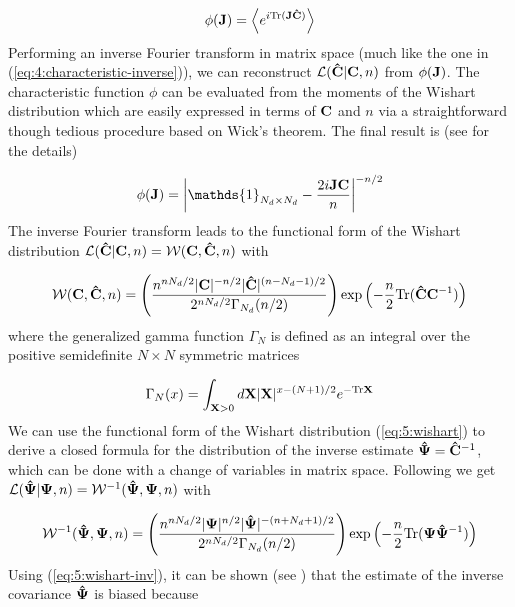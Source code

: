 \begin{equation}
\label{eq:5:chardef}
\phi(\mathbf{J}) = \left\langle e^{i{\rm Tr}(\mathbf{J}\mathbf{\hat{C}})}\right\rangle
\end{equation}
%
Performing an inverse Fourier transform in matrix space (much like the one in (\ref{eq:4:characteristic-inverse})), we can reconstruct $\mathcal{L}(\mathbf{\hat{C}}\vert\mathbf{C},n)$ from $\phi(\mathbf{J})$. The characteristic function $\phi$ can be evaluated from the moments of the Wishart distribution which are easily expressed in terms of $\mathbf{C}$ and $n$ via a straightforward though tedious procedure based on Wick's theorem. The final result is (see \citep{Taylor12} for the details)

\begin{equation}
\label{eq:5:charw}
\phi(\bb{J}) = \left\vert\mathds{1}_{N_d\times N_d}-\frac{2i\bb{JC}}{n}\right\vert^{-n/2}
\end{equation}
%
The inverse Fourier transform leads to the functional form of the Wishart distribution $\mathcal{L}(\mathbf{\hat{C}}\vert\mathbf{C},n) = \mathcal{W}(\mathbf{C},\mathbf{\hat{C}},n)$ with

\begin{equation}
\label{eq:5:wishart}
\mathcal{W}(\mathbf{C},\mathbf{\hat{C}},n) =  \left(\frac{n^{nN_d/2}\vert \mathbf{C}\vert^{-n/2}\vert\mathbf{\hat{C}}\vert^{(n-N_d-1)/2}}{2^{nN_d/2}\Gamma_{N_d}(n/2)}\right)\exp\left(-\frac{n}{2}{\rm Tr}(\mathbf{\hat{C}}\mathbf{C}^{-1})\right)
\end{equation}
%
where the generalized gamma function $\Gamma_N$ is defined as an integral over the positive semidefinite $N\times N$ symmetric matrices 

\begin{equation}
\label{eq:5:gengamma}
\Gamma_N(x) = \int_{\mathbf{X}>0}d\mathbf{X}\vert\mathbf{X}\vert^{x-(N+1)/2}e^{-{\rm Tr}\mathbf{X}}
\end{equation}
%
We can use the functional form of the Wishart distribution (\ref{eq:5:wishart}) to derive a closed formula for the distribution of the inverse estimate $\mathbf{\hat{\Psi}}=\mathbf{\hat{C}}^{-1}$, which can be done with a change of variables in matrix space. Following \citep{Taylor12} we get $\mathcal{L}(\mathbf{\hat{\Psi}}\vert\mathbf{\Psi},n) = \mathcal{W}^{-1}(\mathbf{\hat{\Psi}},\mathbf{\Psi},n)$ with 

\begin{equation}
\label{eq:5:wishart-inv}
\mathcal{W}^{-1}(\mathbf{\hat{\Psi}},\mathbf{\Psi},n) = \left(\frac{n^{nN_d/2}\vert \mathbf{\Psi}\vert^{n/2}\vert\mathbf{\hat{\Psi}}\vert^{-(n+N_d+1)/2}}{2^{nN_d/2}\Gamma_{N_d}(n/2)}\right)\exp\left(-\frac{n}{2}{\rm Tr}(\mathbf{\Psi}\mathbf{\hat{\Psi}}^{-1})\right)
\end{equation}
%
Using (\ref{eq:5:wishart-inv}), it can be shown (see \citep{MasumotoWishart}) that the estimate of the inverse covariance $\mathbf{\hat{\Psi}}$ is biased because

